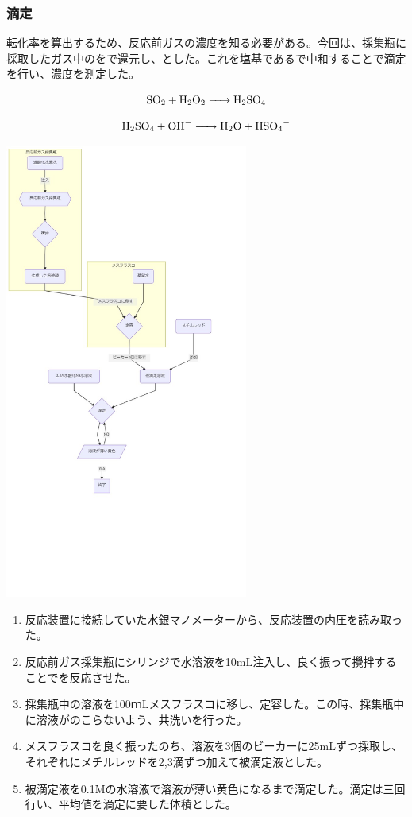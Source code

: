 \documentclass{ltjsarticle}
\begin{document}
\subsubsection{滴定}

転化率を算出するため、反応前ガスの濃度を知る必要がある。今回は、採集瓶に採取したガス中のをで還元し、とした。これを塩基であるで中和することで滴定を行い、濃度を測定した。

\begin{equation}
    \ce{SO2 + H2O2 -> H2SO4}
\end{equation}

\begin{equation}
    \ce{H2SO4 + OH^- -> H2O + HSO4^- }
\end{equation}

\includegraphics[width=8cm]{硫酸滴定.jpg}
\begin{enumerate}
    \item 反応装置に接続していた水銀マノメーターから、反応装置の内圧を読み取った。
    \item 反応前ガス採集瓶にシリンジで水溶液を10mL注入し、良く振って攪拌することでを反応させた。
    \item 採集瓶中の溶液を100ｍLメスフラスコに移し、定容した。この時、採集瓶中に溶液がのこらないよう、共洗いを行った。
    \item メスフラスコを良く振ったのち、溶液を3個のビーカーに25mLずつ採取し、それぞれにメチルレッドを2,3滴ずつ加えて被滴定液とした。
    \item 被滴定液を0.1Mの水溶液で溶液が薄い黄色になるまで滴定した。滴定は三回行い、平均値を滴定に要した体積とした。
\end{enumerate}
\end{document}
